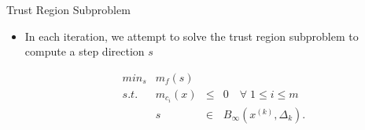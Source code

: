 \documentclass{beamer}
\newcommand{\xk}{{{x}^{(k)}}}
\newcommand{\dk}{{\Delta_k}}
\newcommand{\mk}{{m_f}}
\newcommand{\mck}{{m_{c_i}}}
\newcommand{\bk}{{B_{\infty}(\xk, \dk)}}
\begin{document}
\begin{frame}{Trust Region Subproblem}
    \begin{itemize}
        \item In each iteration, we attempt to solve the trust region subproblem to compute a step direction $s$

        \begin{displaymath}
\begin{array}{lrcc}
min_s & \mk(s)   &     &            \\
s.t.  &  \mck(x) & \le & 0   \quad \forall \; 1 \le i \le m       \\
      &  s & \in & \bk.  \\
\end{array}
        \end{displaymath}
    \end{itemize}
\end{frame}





\end{document}
